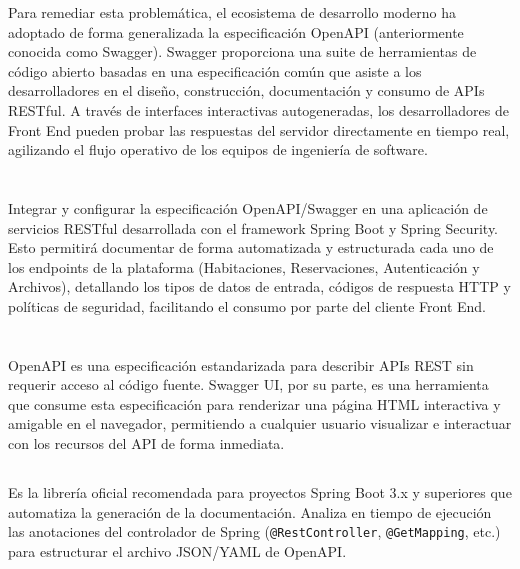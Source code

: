 \documentclass[10pt,a4paper]{article}
\begin{document}
Para remediar esta problemática, el ecosistema de desarrollo moderno ha adoptado de forma generalizada la especificación OpenAPI (anteriormente conocida como Swagger). Swagger proporciona una suite de herramientas de código abierto basadas en una especificación común que asiste a los desarrolladores en el diseño, construcción, documentación y consumo de APIs RESTful. A través de interfaces interactivas autogeneradas, los desarrolladores de Front End pueden probar las respuestas del servidor directamente en tiempo real, agilizando el flujo operativo de los equipos de ingeniería de software.

\pagebreak

\section{\color{colorIPN}{Objetivo de la práctica}}

Integrar y configurar la especificación OpenAPI/Swagger en una aplicación de servicios RESTful desarrollada con el framework Spring Boot y Spring Security. Esto permitirá documentar de forma automatizada y estructurada cada uno de los endpoints de la plataforma (Habitaciones, Reservaciones, Autenticación y Archivos), detallando los tipos de datos de entrada, códigos de respuesta HTTP y políticas de seguridad, facilitando el consumo por parte del cliente Front End.

\pagebreak

\section{\color{colorIPN}{Conceptos}}

\subsection{\textit{\color{colorESCOM}{OpenAPI y Swagger UI}}}
OpenAPI es una especificación estandarizada para describir APIs REST sin requerir acceso al código fuente. Swagger UI, por su parte, es una herramienta que consume esta especificación para renderizar una página HTML interactiva y amigable en el navegador, permitiendo a cualquier usuario visualizar e interactuar con los recursos del API de forma inmediata.

\subsection{\textit{\color{colorESCOM}{Springdoc OpenAPI Starter}}}
Es la librería oficial recomendada para proyectos Spring Boot 3.x y superiores que automatiza la generación de la documentación. Analiza en tiempo de ejecución las anotaciones del controlador de Spring (\texttt{@RestController}, \texttt{@GetMapping}, etc.) para estructurar el archivo JSON/YAML de OpenAPI.
\end{document}
